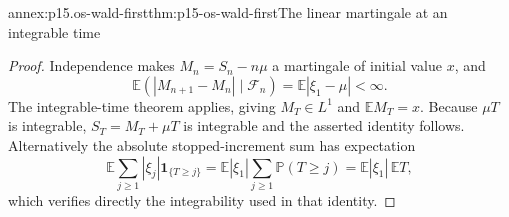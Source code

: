 \begin{annexitem}{annex:p15.os-wald-first}{thm:p15-os-wald-first}{The linear martingale at an integrable time}
\begin{proof}
Independence makes \(M_n=S_n-n\mu\) a martingale of initial
value \(x\), and
\[
 \mathbb E(|M_{n+1}-M_n|\mid\mathcal F_n)
                    =\mathbb E|\xi_1-\mu|<\infty.
 \]
The integrable-time theorem applies, giving \(M_T\in L^1\)
and \(\mathbb EM_T=x\).
Because \(\mu T\) is integrable, \(S_T=M_T+\mu T\) is
integrable and the asserted identity follows.
Alternatively the absolute stopped-increment sum has expectation
\[
 \mathbb E\sum_{j\geq1}|\xi_j|\mathbf1_{\{T\geq j\}}
 =\mathbb E|\xi_1|\sum_{j\geq1}\mathbb P(T\geq j)
 =\mathbb E|\xi_1|\,\mathbb ET,
 \]
which verifies directly the integrability used in that identity.
\end{proof}
\end{annexitem}

